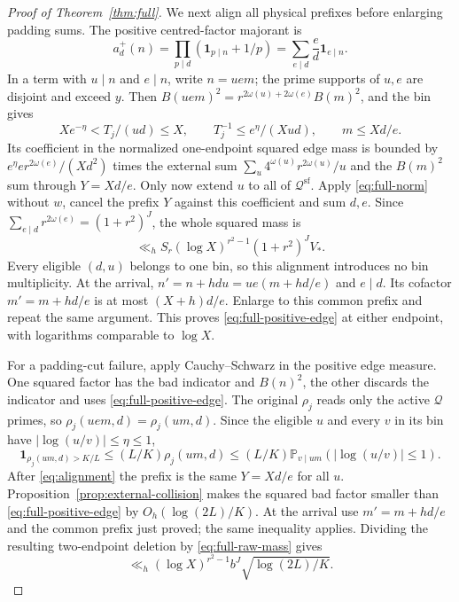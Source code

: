 \documentclass[11pt]{article}
\theoremstyle{definition}
\newcommand{\Prob}{\mathbb P}
\newcommand{\ind}{\mathbf 1}
\theoremstyle{remark}
\numberwithin{equation}{section}
\newcommand{\Qset}{\mathcal Q}
\newcommand{\sfw}{\mathrm{sf}}
\begin{document}
\begin{proof}[Proof of Theorem~\ref{thm:full}]
We next align all physical prefixes before enlarging padding sums.
The positive centred-factor majorant is
\begin{equation}\label{eq:full-majorant}
 a_d^+(n)=\prod_{p\mid d}(\ind_{p\mid n}+1/p)
 =\sum_{e\mid d}\frac ed\ind_{e\mid n}.
\end{equation}
In a term with $u\mid n$ and $e\mid n$, write $n=uem$; the prime supports of $u,e$ are disjoint and exceed $y$.
Then $B(uem)^2=r^{2\omega(u)+2\omega(e)}B(m)^2$, and the bin gives
\begin{equation}\label{eq:alignment}
 Xe^{-\eta}<T_j/(ud)\le X,\qquad T_j^{-1}\le e^\eta/(Xud),\qquad m\le Xd/e.
\end{equation}
Its coefficient in the normalized one-endpoint squared edge mass is bounded by
$e^\eta e r^{2\omega(e)}/(Xd^2)$ times the external sum
$\sum_u4^{\omega(u)}r^{2\omega(u)}/u$ and the $B(m)^2$ sum through $Y=Xd/e$.
Only now extend $u$ to all of $\Qset^{\sfw}$. Apply \eqref{eq:full-norm} without $w$, cancel the prefix $Y$
against this coefficient and sum $d,e$. Since $\sum_{e\mid d}r^{2\omega(e)}=(1+r^2)^J$, the whole squared mass is
\begin{equation}\label{eq:full-positive-edge}
 \ll_h S_r(\log X)^{r^2-1}(1+r^2)^JV_*.
\end{equation}
Every eligible $(d,u)$ belongs to one bin, so this alignment introduces no bin multiplicity.
At the arrival, $n'=n+hdu=ue(m+hd/e)$ and $e\mid d$.
Its cofactor $m'=m+hd/e$ is at most $(X+h)d/e$. Enlarge to this common prefix and repeat the same argument.
This proves \eqref{eq:full-positive-edge} at either endpoint, with logarithms comparable to $\log X$.

For a padding-cut failure, apply Cauchy--Schwarz in the positive edge measure.
One squared factor has the bad indicator and $B(n)^2$, the other discards the indicator and uses
\eqref{eq:full-positive-edge}. The original $\rho_j$ reads only the active $\Qset$ primes, so
$\rho_j(uem,d)=\rho_j(um,d)$. Since the eligible $u$ and every $v$ in its bin have
$|\log(u/v)|\le\eta\le1$,
\begin{equation}\label{eq:full-bad-padding}
 \ind_{\rho_j(um,d)>K/L}\le(L/K)\rho_j(um,d)
 \le(L/K)\Prob_{v\mid um}(|\log(u/v)|\le1).
\end{equation}
After \eqref{eq:alignment} the prefix is the same $Y=Xd/e$ for all $u$.
Proposition~\ref{prop:external-collision} makes the squared bad factor smaller than
\eqref{eq:full-positive-edge} by $O_h(\log(2L)/K)$.
At the arrival use $m'=m+hd/e$ and the common prefix just proved; the same inequality applies.
Dividing the resulting two-endpoint deletion by \eqref{eq:full-raw-mass} gives
\begin{equation}\label{eq:full-padding-deletion}
 \ll_h(\log X)^{r^2-1}b^J\sqrt{\log(2L)/K}.
\end{equation}


\end{proof}
\end{document}
